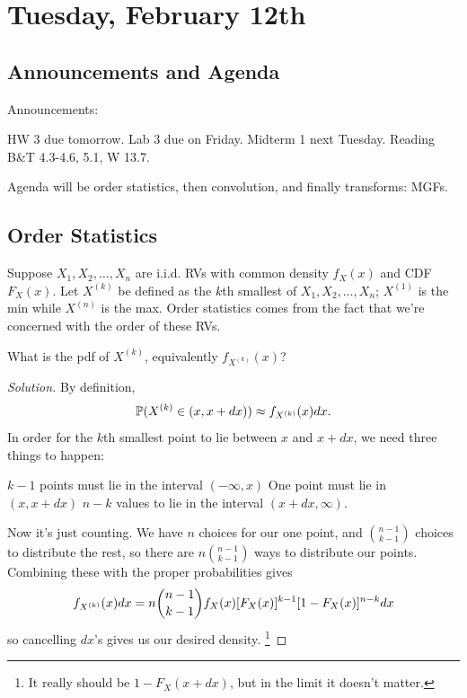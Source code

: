 \documentclass[11 pt]{scrartcl}
\begin{document}
\newpage
\section{Tuesday, February 12th}
\subsection{Announcements and Agenda}
Announcements: 
\begin{enumerate}
    \ii HW 3 due tomorrow. 
    \ii Lab 3 due on Friday. 
    \ii Midterm 1 next Tuesday. 
    \ii Reading B\&T 4.3-4.6, 5.1, W 13.7. 
\end{enumerate}

Agenda will be order statistics, then convolution, and finally transforms: MGFs. 

\subsection{Order Statistics}
Suppose $X_1, X_2, \dots, X_n$ are i.i.d. RVs with common density $f_X(x)$ and CDF $F_X(x)$. Let $X^{(k)}$ be defined as the $k$th smallest of $X_1, X_2, \dots, X_n$; $X^{(1)}$ is the min while $X^{(n)}$ is the max. Order statistics comes from the fact that we're concerned with the order of these RVs. 

\begin{question}
    What is the pdf of $X^{(k)}$, equivalently $f_{X^{(k)}}(x)$?
\end{question}
\begin{proof}[Solution]
    By definition, 
    \[ \mathbb P(X^{(k)} \in (x, x+dx)) \approx f_{X^{(k)}}(x) dx.\] 
    In order for the $k$th smallest point to lie between $x$ and $x+dx$, we need three things to happen: 
    \begin{enumerate}
        \ii $k-1$ points must lie in the interval $(-\infty, x)$ 
        \ii One point must lie in $(x, x+dx)$ 
        \ii $n-k$ values to lie in the interval $(x+dx, \infty)$. 
    \end{enumerate}

    Now it's just counting. We have $n$ choices for our one point, and $\binom{n-1}{k-1}$ choices to distribute the rest, so there are $n\binom{n-1}{k-1}$ ways to distribute our points. Combining these with the proper probabilities gives 
    \[ f_{X^{(k)}}(x) dx = n \dbinom{n-1}{k-1} f_X(x) [F_X(x)]^{k-1}[1-F_X(x)]^{n-k}dx \]
    so cancelling $dx$'s gives us our desired density. \footnote{It really should be $1-F_X(x+dx)$, but in the limit it doesn't matter.}
\end{proof}
\end{document}
